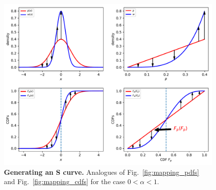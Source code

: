 \documentclass[12pt,letter,timesnewroman]{article}
\newcommand{\fref}[1]{Fig.~\ref{fig:#1}}
\newcommand{\vs}{\textit{vs.}\ }
\newcommand{\ND}{\mathcal{N}} %
\begin{document}
\begin{figure}[!htb]
\centering
\includegraphics[width=\textwidth]{../../figs/mapping_pdfs_cdfs_Sshape.pdf}
\caption{
\textbf{Generating an S curve.} Analogues of \fref{mapping_pdfs} and \fref{mapping_cdfs} for the case $0<\alpha<1$.
}
\end{figure}
\end{document}
